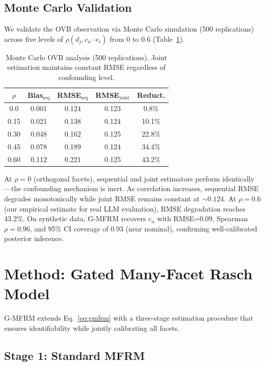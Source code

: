 \documentclass[11pt,twocolumn]{article}
\newcommand{\gmfrm}{\textsc{G-MFRM}}
\begin{document}
\subsection{Monte Carlo Validation}

We validate the OVB observation via Monte Carlo simulation (500 replications) across five levels of $\rho(d_j, c_n \cdot e_i)$ from 0 to 0.6 (Table~\ref{tab:ovb}).

\begin{table}[t]
\centering
\small
\caption{Monte Carlo OVB analysis (500 replications). Joint estimation maintains constant RMSE regardless of confounding level.}
\label{tab:ovb}
\begin{tabular}{@{}ccccc@{}}
\toprule
$\rho$ & Bias$_{\text{seq}}$ & RMSE$_{\text{seq}}$ & RMSE$_{\text{joint}}$ & Reduct. \\
\midrule
0.0  & 0.001 & 0.124 & 0.123 & 0.8\%   \\
0.15 & 0.021 & 0.138 & 0.124 & 10.1\%  \\
0.30 & 0.048 & 0.162 & 0.125 & 22.8\%  \\
0.45 & 0.078 & 0.189 & 0.124 & 34.4\%  \\
0.60 & 0.112 & 0.221 & 0.125 & 43.2\%  \\
\bottomrule
\end{tabular}
\end{table}

At $\rho=0$ (orthogonal facets), sequential and joint estimators perform identically---the confounding mechanism is inert. As correlation increases, sequential RMSE degrades monotonically while joint RMSE remains constant at ${\sim}0.124$. At $\rho=0.6$ (our empirical estimate for real LLM evaluation), RMSE degradation reaches 43.2\%. On synthetic data, \gmfrm{} recovers $c_n$ with RMSE=0.09, Spearman $\rho=0.96$, and 95\% CI coverage of 0.93 (near nominal), confirming well-calibrated posterior inference.

\section{Method: Gated Many-Facet Rasch Model}

\gmfrm{} extends Eq.~\ref{eq:gmfrm} with a three-stage estimation procedure that ensures identifiability while jointly calibrating all facets.

\subsection{Stage 1: Standard MFRM}
\end{document}
